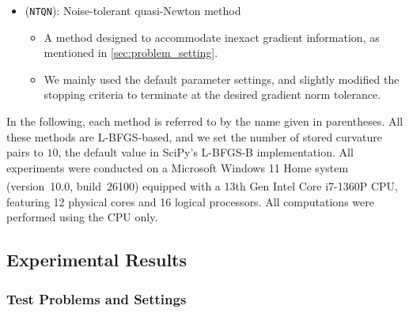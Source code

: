 \documentclass[journal]{subfiles}
\begin{document}
\begin{itemize}
    \item (\texttt{NTQN}): Noise-tolerant quasi-Newton method~\citep{xie2020analysis,shiNoiseTolerantQuasiNewtonAlgorithm2022}
          \begin{itemize}
              \item A method designed to accommodate inexact gradient information, as mentioned in \cref{sec:problem_setting}.
              \item We mainly used the default parameter settings, and slightly modified the stopping criteria to terminate at the desired gradient norm tolerance.
          \end{itemize}
\end{itemize}

In the following, each method is referred to by the name given in parentheses.
All these methods are L-BFGS-based, and we set the number of stored curvature pairs to $10$, the default value in SciPy's L-BFGS-B implementation.
All experiments were conducted on a Microsoft Windows 11 Home system (version~10.0, build~26100) equipped with a 13th Gen Intel\textsuperscript{\textregistered} Core\textsuperscript{\texttrademark} i7-1360P CPU, featuring 12 physical cores and 16 logical processors. All computations were performed using the CPU only.

\subsection{Experimental Results}\label{sec:results}

\subsubsection{Test Problems and Settings}\label{sssec:problems}
\end{document}
